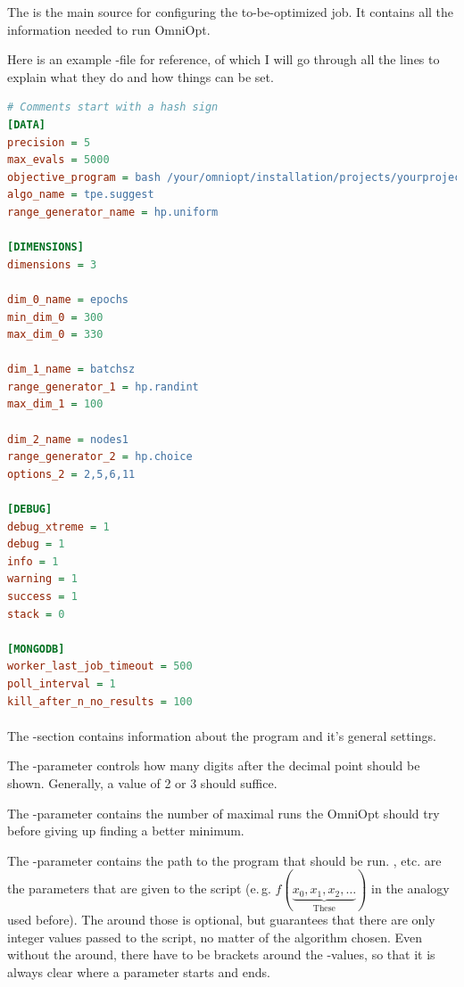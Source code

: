 \documentclass[]{scrartcl}
\begin{document}
The  is the main source for configuring the to-be-optimized job. It contains all the information needed
to run OmniOpt.

Here is an example -file for reference, of which I will go through all the lines to explain what they do
and how things can be set.

\begin{lstlisting}[language=Ini]
# Comments start with a hash sign
[DATA]
precision = 5
max_evals = 5000
objective_program = bash /your/omniopt/installation/projects/yourproject/program/run.sh int($x_0) int($x_1) ($x_2)
algo_name = tpe.suggest
range_generator_name = hp.uniform

[DIMENSIONS]
dimensions = 3

dim_0_name = epochs
min_dim_0 = 300
max_dim_0 = 330

dim_1_name = batchsz
range_generator_1 = hp.randint
max_dim_1 = 100

dim_2_name = nodes1
range_generator_2 = hp.choice
options_2 = 2,5,6,11

[DEBUG]
debug_xtreme = 1
debug = 1
info = 1
warning = 1
success = 1
stack = 0

[MONGODB]
worker_last_job_timeout = 500
poll_interval = 1
kill_after_n_no_results = 100
\end{lstlisting}

\paragraph{\ctexttt{[DATA]}}

The \ctexttt{[DATA]}-section contains information about the program and it's general settings. 

The -parameter controls how many digits after the decimal point should be shown. Generally, a value
of 2 or 3 should suffice.

The -parameter contains the number of maximal runs the OmniOpt should try before giving up finding
a better minimum.

The -parameter contains the path to the program that should be run. 
,  etc. are the parameters that are given to the script (e.\,g.
$ f(\underbrace{x_0, x_1, x_2, \dots}_{\mathrm{These}}) $ in the analogy used before). The  around those is optional,
but guarantees that there are only integer values passed to the script, no matter of the algorithm chosen. Even without the 
around, there have to be brackets around the -values, so that it is always clear where a parameter starts and ends.
\end{document}
